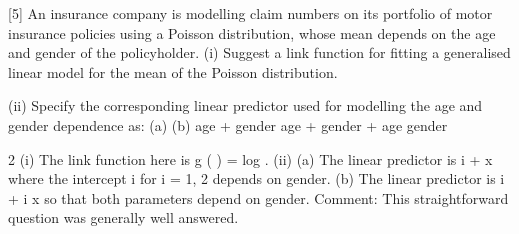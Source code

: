 \documentclass[a4paper,12pt]{article}
\begin{document}
 

[5]
An insurance company is modelling claim numbers on its portfolio of motor insurance
policies using a Poisson distribution, whose mean depends on the age and gender of
the policyholder.
(i) Suggest a link function for fitting a generalised linear model for the mean of
the Poisson distribution.

(ii) Specify the corresponding linear predictor used for modelling the age and
gender dependence as:
(a)
(b)
age + gender
age + gender + age \times gender


2
(i) The link function here is g ( \mu  ) = log \mu  .
(ii) (a) The linear predictor is \alpha i + \beta x where the intercept \alpha i for i = 1, 2
depends on gender.
(b) The linear predictor is \alpha i + \beta i x so that both parameters depend on
gender.
Comment: This straightforward question was generally well answered.
\end{document}
